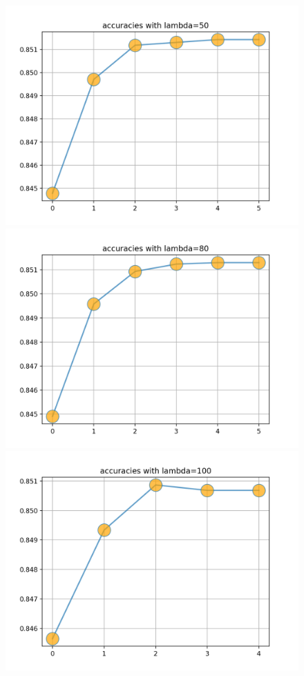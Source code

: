 \documentclass[12pt]{article}
\begin{document}
\begin{figure}[ht]
\includegraphics[scale=0.47]{10.png}
\includegraphics[scale=0.47]{11.png}
\includegraphics[scale=0.47]{12.png}
\end{figure}
\end{document}
